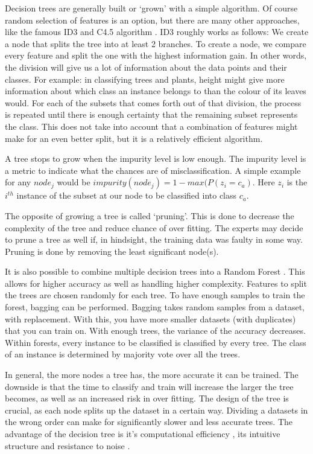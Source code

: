 Decision trees are generally built or `grown' with a simple algorithm. Of course random selection of features is an option, but there are many other approaches, like the famous ID3 \cite{quinlan1986induction} and C4.5 algorithm \cite{quinlan1993c4}. ID3 roughly works as follows: We create a node that splits the tree into at least 2 branches. To create a node, we compare every feature and split the one with the highest information gain. In other words, the division will give us a lot of information about the data points and their classes. For example: in classifying trees and plants, height might give more information about which class an instance belongs to than the colour of its leaves would. For each of the subsets that comes forth out of that division, the process is repeated until there is enough certainty that the remaining subset represents the class. This does not take into account that a combination of features might make for an even better split, but it is a relatively efficient algorithm. %

A tree stops to grow when the impurity level is low enough. The impurity level is a metric to indicate what the chances are of misclassification. A simple example for any $node_j$ would be $impurity(node_j) = 1 - max(P(z_i = c_a) $. Here $z_i$ is the $i^{th}$ instance of the subset at our node to be classified into class $c_a$. 

The opposite of growing a tree is called `pruning'. This is done to decrease the complexity of the tree and reduce chance of over fitting. The experts may decide to prune a tree as well if, in hindsight, the training data was faulty in some way. Pruning is done by removing the least significant node(s). 

It is also possible to combine multiple decision trees into a Random Forest \cite{breiman2001random}. This allows for higher accuracy as well as handling higher complexity. Features to split the trees are chosen randomly for each tree. To have enough samples to train the forest, bagging can be performed. Bagging takes random samples from a dataset, with replacement. With this, you have more smaller datasets (with duplicates) that you can train on. With enough trees, the variance of the accuracy decreases. Within forests, every instance to be classified is classified by every tree. The class of an instance is determined by majority vote over all the trees. 

In general, the more nodes a tree has, the more accurate it can be trained. The downside is that the time to classify and train will increase the larger the tree becomes, as well as an increased risk in over fitting. The design of the tree is crucial, as each node splits up the dataset in a certain way. Dividing a datasets in the wrong order can make for significantly slower and less accurate trees. The advantage of the decision tree is it's computational efficiency \cite{safavian1991survey}, its intuitive structure and resistance to noise \cite{LópezChau20136283}.